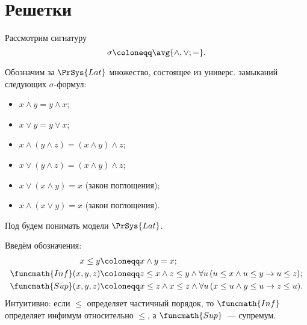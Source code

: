 





\section*{Решетки}

\begin{definition*}
    Рассмотрим сигнатуру
    $$
        \sigma \coloneqq \avg{\land, \lor; =}.
    $$

    Обозначим за $\PrSys{Lat}$ множество, состоящее из универс. замыканий следующих $\sigma$-формул:
    \begin{itemize}
        \item $x \land y = y \land x$;
        \item $x \lor y = y \lor x$;
        \item $x \land (y \land z) = (x \land y) \land z$;
        \item $x \lor (y \land z) = (x \land y) \land z$;
        \item $x \lor (x \land y) = x$ \hfill (закон поглощения);
        \item $x \land (x \lor y) = x$ \hfill (закон поглощения).
    \end{itemize}

    Под  будем понимать модели $\PrSys{Lat}$.
\end{definition*}



\begin{definition*}
    Введём обозначения:
    \begin{align*}
      x \leq y &\coloneqq x \land y = x;\\
      \funcmath{Inf}(x, y, z) &\coloneqq z \leq x \wedge z \leq y \wedge \forall u\, (u \leq x \wedge u
                                \leq y \rightarrow u \leq z);\\
      \funcmath{Sup}(x, y, z) &\coloneqq x \leq z \wedge x \leq z \wedge \forall u\, (x \leq u \wedge y
                                \leq u \rightarrow z \leq u).
    \end{align*}
    Интуитивно: если $\leq$ определяет частичный порядок, то $\funcmath{Inf}$ определяет инфимум
    относительно $\leq$, а $\funcmath{Sup}$~--- супремум.
\end{definition*}


